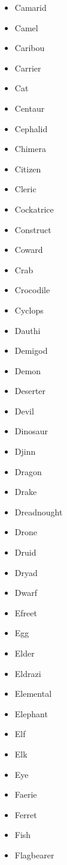 \documentclass{article}
\begin{document}
\begin{multicols}{3}
\begin{itemize}
        \item Camarid
        \item Camel
        \item Caribou
        \item Carrier
        \item Cat
        \item Centaur
        \item Cephalid
        \item Chimera
        \item Citizen
        \item Cleric
        \item Cockatrice
        \item Construct
        \item Coward
        \item Crab
        \item Crocodile
        \item Cyclops
        \item Dauthi
        \item Demigod
        \item Demon
        \item Deserter
        \item Devil
        \item Dinosaur
        \item Djinn
        \item Dragon
        \item Drake
        \item Dreadnought
        \item Drone
        \item Druid
        \item Dryad
        \item Dwarf
        \item Efreet
        \item Egg
        \item Elder
        \item Eldrazi
        \item Elemental
        \item Elephant
        \item Elf
        \item Elk
        \item Eye
        \item Faerie
        \item Ferret
        \item Fish
        \item Flagbearer

\end{itemize}
\end{multicols}
\end{document}
